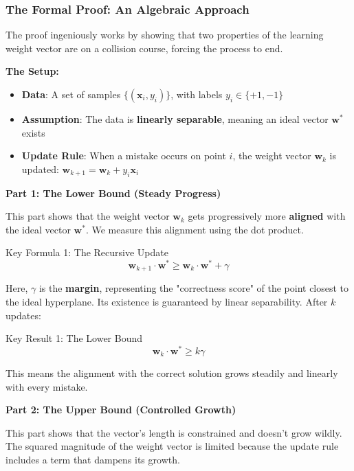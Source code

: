 \subsubsection{The Formal Proof: An Algebraic Approach}

The proof ingeniously works by showing that two properties of the learning weight vector are on a collision course, forcing the process to end.

\textbf{The Setup:}
\begin{itemize}
    \item \textbf{Data}: A set of samples \(\{(\mathbf{x}_i, y_i)\}\), with labels \(y_i \in \{+1, -1\}\)
    \item \textbf{Assumption}: The data is \textbf{linearly separable}, meaning an ideal vector \(\mathbf{w}^*\) exists
    \item \textbf{Update Rule}: When a mistake occurs on point \(i\), the weight vector \(\mathbf{w}_k\) is updated: \(\mathbf{w}_{k+1} = \mathbf{w}_k + y_i \mathbf{x}_i\)
\end{itemize}

\textbf{Part 1: The Lower Bound (Steady Progress)}

This part shows that the weight vector \(\mathbf{w}_k\) gets progressively more \textbf{aligned} with the ideal vector \(\mathbf{w}^*\). We measure this alignment using the dot product.

\begin{block}{Key Formula 1: The Recursive Update}
\[\mathbf{w}_{k+1} \cdot \mathbf{w}^* \geq \mathbf{w}_k \cdot \mathbf{w}^* + \gamma\]
\end{block}

Here, \(\gamma\) is the \textbf{margin}, representing the "correctness score" of the point closest to the ideal hyperplane. Its existence is guaranteed by linear separability. After \(k\) updates:

\begin{block}{Key Result 1: The Lower Bound}
\[\mathbf{w}_k \cdot \mathbf{w}^* \geq k \gamma\]
\end{block}

This means the alignment with the correct solution grows steadily and linearly with every mistake.

\textbf{Part 2: The Upper Bound (Controlled Growth)}

This part shows that the vector's length is constrained and doesn't grow wildly. The squared magnitude of the weight vector is limited because the update rule includes a term that dampens its growth.

